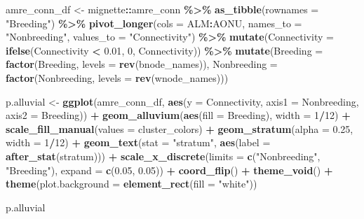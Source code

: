 \documentclass[
]{book}
\newenvironment{Shaded}{\begin{snugshade}}{\end{snugshade}}
\newcommand{\AttributeTok}[1]{\textcolor[rgb]{0.13,0.29,0.53}{#1}}
\newcommand{\DecValTok}[1]{\textcolor[rgb]{0.00,0.00,0.81}{#1}}
\newcommand{\FloatTok}[1]{\textcolor[rgb]{0.00,0.00,0.81}{#1}}
\newcommand{\FunctionTok}[1]{\textcolor[rgb]{0.13,0.29,0.53}{\textbf{#1}}}
\newcommand{\NormalTok}[1]{#1}
\newcommand{\OtherTok}[1]{\textcolor[rgb]{0.56,0.35,0.01}{#1}}
\newcommand{\SpecialCharTok}[1]{\textcolor[rgb]{0.81,0.36,0.00}{\textbf{#1}}}
\newcommand{\StringTok}[1]{\textcolor[rgb]{0.31,0.60,0.02}{#1}}
\begin{document}
\begin{Shaded}
\begin{Highlighting}[]
\NormalTok{amre\_conn\_df }\OtherTok{\textless{}{-}}\NormalTok{ mignette}\SpecialCharTok{::}\NormalTok{amre\_conn }\SpecialCharTok{\%\textgreater{}\%}
  \FunctionTok{as\_tibble}\NormalTok{(}\AttributeTok{rownames =} \StringTok{"Breeding"}\NormalTok{) }\SpecialCharTok{\%\textgreater{}\%}
  \FunctionTok{pivot\_longer}\NormalTok{(}\AttributeTok{cols =}\NormalTok{ ALM}\SpecialCharTok{:}\NormalTok{AONU, }\AttributeTok{names\_to =} \StringTok{"Nonbreeding"}\NormalTok{, }\AttributeTok{values\_to =} \StringTok{"Connectivity"}\NormalTok{) }\SpecialCharTok{\%\textgreater{}\%}
  \FunctionTok{mutate}\NormalTok{(}\AttributeTok{Connectivity =} \FunctionTok{ifelse}\NormalTok{(Connectivity }\SpecialCharTok{\textless{}} \FloatTok{0.01}\NormalTok{, }\DecValTok{0}\NormalTok{, Connectivity)) }\SpecialCharTok{\%\textgreater{}\%}
  \FunctionTok{mutate}\NormalTok{(}\AttributeTok{Breeding =} \FunctionTok{factor}\NormalTok{(Breeding, }\AttributeTok{levels =} \FunctionTok{rev}\NormalTok{(bnode\_names)),}
         \AttributeTok{Nonbreeding =} \FunctionTok{factor}\NormalTok{(Nonbreeding, }\AttributeTok{levels =} \FunctionTok{rev}\NormalTok{(wnode\_names)))}

\NormalTok{p.alluvial }\OtherTok{\textless{}{-}} \FunctionTok{ggplot}\NormalTok{(amre\_conn\_df,}
       \FunctionTok{aes}\NormalTok{(}\AttributeTok{y =}\NormalTok{ Connectivity, }\AttributeTok{axis1 =}\NormalTok{ Nonbreeding, }\AttributeTok{axis2 =}\NormalTok{ Breeding)) }\SpecialCharTok{+}
  \FunctionTok{geom\_alluvium}\NormalTok{(}\FunctionTok{aes}\NormalTok{(}\AttributeTok{fill =}\NormalTok{ Breeding), }\AttributeTok{width =} \DecValTok{1}\SpecialCharTok{/}\DecValTok{12}\NormalTok{) }\SpecialCharTok{+}
  \FunctionTok{scale\_fill\_manual}\NormalTok{(}\AttributeTok{values =}\NormalTok{ cluster\_colors) }\SpecialCharTok{+}
  \FunctionTok{geom\_stratum}\NormalTok{(}\AttributeTok{alpha =} \FloatTok{0.25}\NormalTok{, }\AttributeTok{width =} \DecValTok{1}\SpecialCharTok{/}\DecValTok{12}\NormalTok{) }\SpecialCharTok{+}
  \FunctionTok{geom\_text}\NormalTok{(}\AttributeTok{stat =} \StringTok{"stratum"}\NormalTok{, }\FunctionTok{aes}\NormalTok{(}\AttributeTok{label =} \FunctionTok{after\_stat}\NormalTok{(stratum))) }\SpecialCharTok{+}
  \FunctionTok{scale\_x\_discrete}\NormalTok{(}\AttributeTok{limits =} \FunctionTok{c}\NormalTok{(}\StringTok{"Nonbreeding"}\NormalTok{, }\StringTok{"Breeding"}\NormalTok{),}
                   \AttributeTok{expand =} \FunctionTok{c}\NormalTok{(}\FloatTok{0.05}\NormalTok{, }\FloatTok{0.05}\NormalTok{)) }\SpecialCharTok{+} 
  \FunctionTok{coord\_flip}\NormalTok{() }\SpecialCharTok{+}
  \FunctionTok{theme\_void}\NormalTok{() }\SpecialCharTok{+}
  \FunctionTok{theme}\NormalTok{(}\AttributeTok{plot.background =} \FunctionTok{element\_rect}\NormalTok{(}\AttributeTok{fill =} \StringTok{"white"}\NormalTok{))}

\NormalTok{p.alluvial}
\end{Highlighting}
\end{Shaded}
\end{document}
